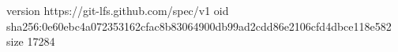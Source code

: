 version https://git-lfs.github.com/spec/v1
oid sha256:0e60ebc4a072353162cfac8b83064900db99ad2cdd86e2106cfd4dbce118e582
size 17284
